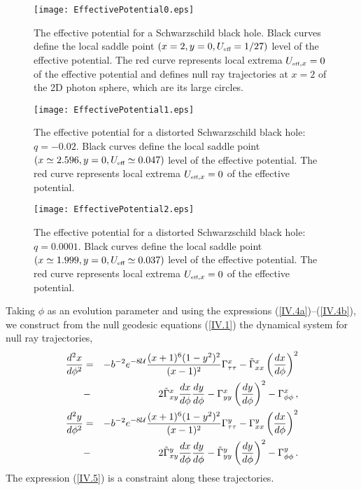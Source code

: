 \documentclass[twocolumn,showpacs,preprintnumbers,amsmath,amssymb,floatfix,nofootinbib]{revtex4-1}
\newcommand{\ba}{\begin{eqnarray}}
\newcommand{\ea}{\end{eqnarray}}
\newcommand{\non}{\nonumber}
\newcommand{\eq}[1]{(\ref{#1})}
\newcommand{\n}[1]{\label{#1}}
\newcommand{\ind}[1]{\mbox{\tiny #1}}
\newcommand{\cu}{{\cal U}}
\begin{document}
\begin{figure}[htb]
\begin{center}
\hspace{0cm}
\texttt{[image: EffectivePotential0.eps]}
\caption{The effective potential for a Schwarzschild black hole. Black curves define the local saddle point $(x=2,y=0,U_{\ind{eff}}=1/27)$ level of the effective potential. The red curve represents local extrema $U_{\ind{eff},x}=0$ of the effective potential and defines null ray trajectories at $x=2$ of the 2D photon sphere, which are its large circles.}\label{fig2}
\end{center}
\end{figure}
\begin{figure}[htb]
\begin{center}
\hspace{0cm}
\texttt{[image: EffectivePotential1.eps]}
\caption{The effective potential for a distorted Schwarzschild black hole: $q=-0.02$. Black curves define the local saddle point $(x\simeq2.596,y=0,U_{\ind{eff}}\simeq0.047)$ level of the effective potential. The red curve represents local extrema $U_{\ind{eff},x}=0$ of the effective potential.}\label{fig3}
\end{center}
\end{figure}
\begin{figure}[htb]
\begin{center}
\hspace{0cm}
\texttt{[image: EffectivePotential2.eps]}
\caption{The effective potential for a distorted Schwarzschild black hole: $q=0.0001$. Black curves define the local saddle point $(x\simeq1.999,y=0,U_{\ind{eff}}\simeq0.037)$ level of the effective potential. The red curve represents local extrema $U_{\ind{eff},x}=0$ of the effective potential.}\label{fig4}
\end{center}
\end{figure}

Taking $\phi$ as an evolution parameter and using the expressions \eq{IV.4a}--\eq{IV.4b}, we construct from the null geodesic equations \eq{IV.1} the dynamical system for null ray trajectories,
\ba
\frac{d^2x}{d\phi^2}&=&-b^{-2}e^{-8\cu}\frac{(x+1)^6(1-y^2)^2}{(x-1)^2}\Gamma^{x}_{\tau\tau}-\tilde{\Gamma}^{x}_{xx}\left(\frac{dx}{d\phi}\right)^2\non\\
&-&2\tilde{\Gamma}^{x}_{xy}\frac{dx}{d\phi}\frac{dy}{d\phi}-\Gamma^{x}_{yy}\left(\frac{dy}{d\phi}\right)^2-\Gamma^{x}_{\phi\phi}\,,\n{IV.7a}\\
\frac{d^2y}{d\phi^2}&=&-b^{-2}e^{-8\cu}\frac{(x+1)^6(1-y^2)^2}{(x-1)^2}\Gamma^{y}_{\tau\tau}-\Gamma^{y}_{xx}\left(\frac{dx}{d\phi}\right)^2\non\\
&-&2\tilde{\Gamma}^{y}_{xy}\frac{dx}{d\phi}\frac{dy}{d\phi}-\tilde{\Gamma}^{y}_{yy}\left(\frac{dy}{d\phi}\right)^2-\Gamma^{y}_{\phi\phi}\,.\n{IV.7b}
\ea
The expression \eq{IV.5} is a constraint along these trajectories. 
\end{document}
